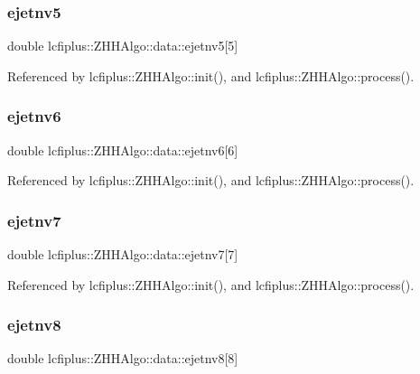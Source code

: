 \subsubsection{ejetnv5}
{\footnotesize\ttfamily double lcfiplus\+::\+Z\+H\+H\+Algo\+::data\+::ejetnv5[5]}



Referenced by lcfiplus\+::\+Z\+H\+H\+Algo\+::init(), and lcfiplus\+::\+Z\+H\+H\+Algo\+::process().

\mbox{\label{structlcfiplus_1_1ZHHAlgo_1_1data_a894e67b238ccdf608b238dbdec67fa83}} 
\subsubsection{ejetnv6}
{\footnotesize\ttfamily double lcfiplus\+::\+Z\+H\+H\+Algo\+::data\+::ejetnv6[6]}



Referenced by lcfiplus\+::\+Z\+H\+H\+Algo\+::init(), and lcfiplus\+::\+Z\+H\+H\+Algo\+::process().

\mbox{\label{structlcfiplus_1_1ZHHAlgo_1_1data_ab41b3e17d1d83e57e803ed45f46b4641}} 
\subsubsection{ejetnv7}
{\footnotesize\ttfamily double lcfiplus\+::\+Z\+H\+H\+Algo\+::data\+::ejetnv7[7]}



Referenced by lcfiplus\+::\+Z\+H\+H\+Algo\+::init(), and lcfiplus\+::\+Z\+H\+H\+Algo\+::process().

\mbox{\label{structlcfiplus_1_1ZHHAlgo_1_1data_af7c99d8f72e3360aa51cce53367ef53f}} 
\subsubsection{ejetnv8}
{\footnotesize\ttfamily double lcfiplus\+::\+Z\+H\+H\+Algo\+::data\+::ejetnv8[8]}



